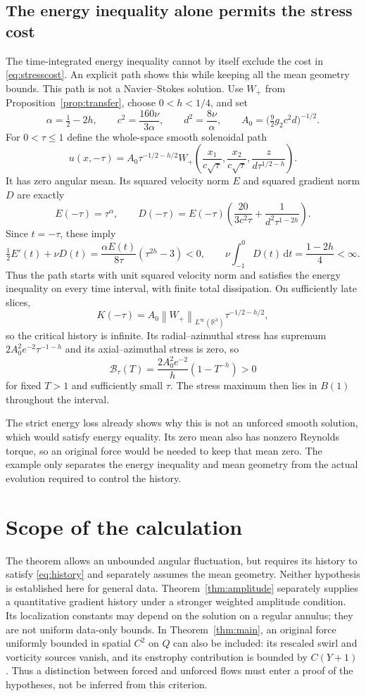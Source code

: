\documentclass[11pt]{article}
\theoremstyle{remark}
\newcommand{\R}{\mathbb R}
\newcommand{\dd}{\,\mathrm d}
\newcommand{\norm}[1]{\left\lVert#1\right\rVert}
\begin{document}
\subsection{The energy inequality alone permits the stress cost}

The time-integrated energy inequality cannot by itself exclude the cost
in \eqref{eq:stresscost}. An explicit path shows this while keeping all
the mean geometry bounds. This path is not a Navier--Stokes solution.
Use $W_+$ from Proposition~\ref{prop:transfer}, choose $0<h<1/4$, and set
\[
 \alpha=\tfrac12-2h,\qquad
 c^2=\frac{160\nu}{3\alpha},\qquad d^2=\frac{8\nu}{\alpha},\qquad
 A_0=\big(\tfrac92g_2c^2d\big)^{-1/2}.
\]
For $0<\tau\leq1$ define the whole-space smooth solenoidal path
\[
 u(x,-\tau)=A_0\tau^{-1/2-h/2}
  W_+\left(\frac{x_1}{c\sqrt\tau},
           \frac{x_2}{c\sqrt\tau},
           \frac{z}{d\tau^{1/2-h}}\right).
\]
It has zero angular mean. Its squared velocity norm $E$ and squared
gradient norm $D$ are exactly
\[
 E(-\tau)=\tau^\alpha,\qquad
 D(-\tau)=E(-\tau)\left(\frac{20}{3c^2\tau}
                        +\frac{1}{d^2\tau^{1-2h}}\right).
\]
Since $t=-\tau$, these imply
\[
 \tfrac12E'(t)+\nu D(t)
   =\frac{\alpha E(t)}{8\tau}(\tau^{2h}-3)<0,\qquad
 \nu\int_{-1}^0D(t)\dd t=\frac{1-2h}{4}<\infty.
\]
Thus the path starts with unit squared velocity norm and satisfies the
energy inequality on every time interval, with finite total dissipation.
On sufficiently late slices,
\[
 K(-\tau)=A_0\norm{W_+}_{L^\infty(\R^3)}\tau^{-1/2-h/2},
\]
so the critical history is infinite. Its radial--azimuthal stress has supremum
$2A_0^2e^{-2}\tau^{-1-h}$ and its axial--azimuthal stress is zero, so
\[
 \mathcal B_\tau(T)=\frac{2A_0^2e^{-2}}h(1-T^{-h})>0
\]
for fixed $T>1$ and sufficiently small $\tau$. The stress maximum then
lies in $B(1)$ throughout the interval.

The strict energy loss already shows why this is not an unforced smooth
solution, which would satisfy energy equality. Its zero mean also has
nonzero Reynolds torque, so an original force would be needed to keep
that mean zero. The example only separates the energy inequality and
mean geometry from the actual evolution required to control the history.

\section{Scope of the calculation}

The theorem allows an unbounded angular fluctuation, but requires its
history to satisfy \eqref{eq:history} and separately assumes the mean
geometry. Neither hypothesis is established here for general data.
Theorem~\ref{thm:amplitude} separately supplies a quantitative gradient
history under a stronger weighted amplitude condition. Its localization
constants may depend on the solution on a regular annulus; they are not
uniform data-only bounds.
In Theorem~\ref{thm:main}, an original force uniformly bounded in
spatial $C^2$ on $Q$ can also be included: its rescaled swirl and
vorticity sources vanish, and its
enstrophy contribution is bounded by $C(Y+1)$.
Thus a distinction between forced and unforced flows must enter a
proof of the hypotheses, not be inferred from this criterion.
\end{document}
